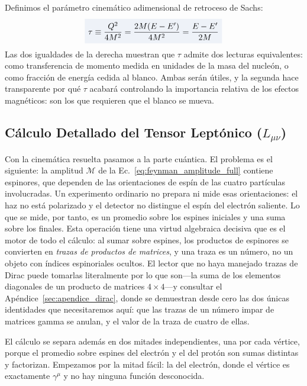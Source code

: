 \documentclass[10pt,a4paper]{article}
\newcommand{\dest}[1]{{\setlength{\fboxsep}{4pt}\colorbox{colordest}{$\displaystyle #1$}}}
\begin{document}
Definimos el parámetro cinemático adimensional de retroceso de Sachs:
\begin{equation}
\dest{\tau \equiv \frac{Q^2}{4M^2} = \frac{2M(E - E')}{4M^2} = \frac{E - E'}{2M}}
\label{eq:tau_def}
\end{equation}
Las dos igualdades de la derecha muestran que $\tau$ admite dos lecturas equivalentes: como transferencia de momento medida en unidades de la masa del nucleón, o como fracción de energía cedida al blanco. Ambas serán útiles, y la segunda hace transparente por qué $\tau$ acabará controlando la importancia relativa de los efectos magnéticos: son los que requieren que el blanco se mueva.

\subsection{Cálculo Detallado del Tensor Leptónico (\texorpdfstring{$L_{\mu\nu}$}{L\_munu})}
Con la cinemática resuelta pasamos a la parte cuántica. El problema es el siguiente: la amplitud $\mathcal{M}$ de la Ec.~\eqref{eq:feynman_amplitude_full} contiene espinores, que dependen de las orientaciones de espín de las cuatro partículas involucradas. Un experimento ordinario no prepara ni mide esas orientaciones: el haz no está polarizado y el detector no distingue el espín del electrón saliente. Lo que se mide, por tanto, es un promedio sobre los espines iniciales y una suma sobre los finales. Esta operación tiene una virtud algebraica decisiva que es el motor de todo el cálculo: al sumar sobre espines, los productos de espinores se convierten en \emph{trazas de productos de matrices}, y una traza es un número, no un objeto con índices espinoriales ocultos. El lector que no haya manejado trazas de Dirac puede tomarlas literalmente por lo que son---la suma de los elementos diagonales de un producto de matrices $4\times 4$---y consultar el Apéndice~\ref{sec:apendice_dirac}, donde se demuestran desde cero las dos únicas identidades que necesitaremos aquí: que las trazas de un número impar de matrices gamma se anulan, y el valor de la traza de cuatro de ellas.

El cálculo se separa además en dos mitades independientes, una por cada vértice, porque el promedio sobre espines del electrón y el del protón son sumas distintas y factorizan. Empezamos por la mitad fácil: la del electrón, donde el vértice es exactamente $\gamma^\mu$ y no hay ninguna función desconocida.
\end{document}
